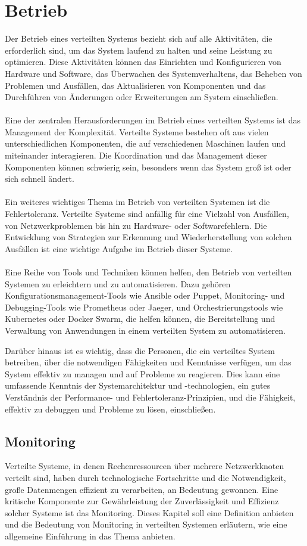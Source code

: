 \section{Betrieb}
Der Betrieb eines verteilten Systems bezieht sich auf alle Aktivitäten, die erforderlich sind, um das System laufend zu halten und seine Leistung zu optimieren. Diese Aktivitäten können das Einrichten und Konfigurieren von Hardware und Software, das Überwachen des Systemverhaltens, das Beheben von Problemen und Ausfällen, das Aktualisieren von Komponenten und das Durchführen von Änderungen oder Erweiterungen am System einschließen.
\\\\
Eine der zentralen Herausforderungen im Betrieb eines verteilten Systems ist das Management der Komplexität. Verteilte Systeme bestehen oft aus vielen unterschiedlichen Komponenten, die auf verschiedenen Maschinen laufen und miteinander interagieren. Die Koordination und das Management dieser Komponenten können schwierig sein, besonders wenn das System groß ist oder sich schnell ändert.
\\\\
Ein weiteres wichtiges Thema im Betrieb von verteilten Systemen ist die Fehlertoleranz. Verteilte Systeme sind anfällig für eine Vielzahl von Ausfällen, von Netzwerkproblemen bis hin zu Hardware- oder Softwarefehlern. Die Entwicklung von Strategien zur Erkennung und Wiederherstellung von solchen Ausfällen ist eine wichtige Aufgabe im Betrieb dieser Systeme.
\\\\
Eine Reihe von Tools und Techniken können helfen, den Betrieb von verteilten Systemen zu erleichtern und zu automatisieren. Dazu gehören Konfigurationsmanagement-Tools wie Ansible oder Puppet, Monitoring- und Debugging-Tools wie Prometheus oder Jaeger, und Orchestrierungstools wie Kubernetes oder Docker Swarm, die helfen können, die Bereitstellung und Verwaltung von Anwendungen in einem verteilten System zu automatisieren.

Darüber hinaus ist es wichtig, dass die Personen, die ein verteiltes System betreiben, über die notwendigen Fähigkeiten und Kenntnisse verfügen, um das System effektiv zu managen und auf Probleme zu reagieren. Dies kann eine umfassende Kenntnis der Systemarchitektur und -technologien, ein gutes Verständnis der Performance- und Fehlertoleranz-Prinzipien, und die Fähigkeit, effektiv zu debuggen und Probleme zu lösen, einschließen.

\subsection{Monitoring}
Verteilte Systeme, in denen Rechenressourcen über mehrere Netzwerkknoten verteilt sind, haben durch technologische Fortschritte und die Notwendigkeit, große Datenmengen effizient zu verarbeiten, an Bedeutung gewonnen. Eine kritische Komponente zur Gewährleistung der Zuverlässigkeit und Effizienz solcher Systeme ist das Monitoring. Dieses Kapitel soll eine Definition anbieten und die Bedeutung von Monitoring in verteilten Systemen erläutern, wie eine allgemeine Einführung in das Thema anbieten. 

